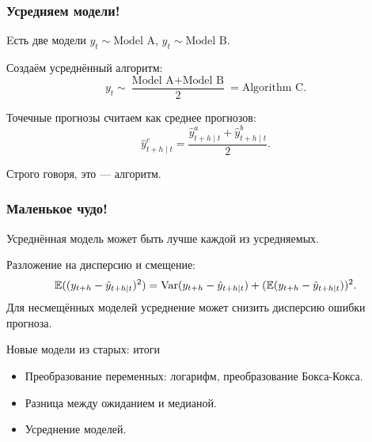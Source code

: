\begin{frame}
    \frametitle{Усредняем модели!}
    Eсть две модели $y_t \sim \text{Model A}$, $y_t \sim \text{Model B}$.

    \pause 
    Создаём \alert{усреднённый алгоритм}:
    \[
    y_t \sim \frac{\text{Model A} + \text{Model B}}{2} = \text{Algorithm C}.    
    \]

    \pause 
    Точечные прогнозы считаем как \alert{среднее} прогнозов:
    \[
        \hat y^c_{t+h\mid t} = \frac{\hat y^a_{t+h\mid t} + \hat y^b_{t+h\mid t}}{2}.
    \]

    \pause
    Строго говоря, это — \alert{алгоритм}.

\end{frame}

\begin{frame}
    \frametitle{Маленькое чудо!}

    Усреднённая модель \alert{может быть лучше} каждой из усредняемых.

    \pause
    Разложение на дисперсию и смещение:
    \[
        \mathbb{E}((y_{t+h} - \hat y_{t+h \mid t})^2) = \operatorname{Var}(y_{t+h} - \hat y_{t+h \mid t}) + (\mathbb{E}(y_{t+h} - \hat y_{t+h \mid t}))^2.
    \]
    \pause
    Для \alert{несмещённых} моделей усреднение может снизить дисперсию ошибки прогноза.     
    

\end{frame}


\begin{frame}{Новые модели из старых: итоги}

  \begin{itemize}[<+->]
    \item Преобразование переменных: логарифм, преобразование Бокса-Кокса.
    \item Разница между ожиданием и медианой. 
    \item Усреднение моделей.
  \end{itemize}
\end{frame}

